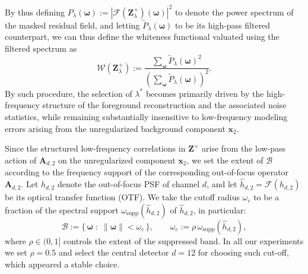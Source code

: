 \documentclass[letterpaper]{article}
\begin{document}
By thus defining
$
P_\lambda(\boldsymbol\omega)
:=
|\mathcal F(\mathbf Z_\lambda^+)(\boldsymbol\omega)|^2
$
to denote the power spectrum of the masked residual field, and letting
$
\widetilde P_\lambda(\boldsymbol\omega)
$
to be its high-pass filtered counterpart, we can thus define the whiteness functional valuated using the filtered spectrum as
\begin{equation}
    \mathcal W(\mathbf Z_\lambda^+)
    :=
    \frac{
    \displaystyle
    \sum_{\boldsymbol\omega}
    \widetilde P_\lambda(\boldsymbol\omega)^2
    }{
    \left(
    \displaystyle
    \sum_{\boldsymbol\omega}
    \widetilde P_\lambda(\boldsymbol\omega)
    \right)^2
    }.
\end{equation}
By such procedure, the selection of $\lambda^*$ becomes primarily driven by the high-frequency structure of the foreground reconstruction and the associated noise statistics, while remaining substantially insensitive to low-frequency modeling errors arising from the unregularized background component $\mathbf x_2$.


Since the structured low-frequency correlations in $\mathbf Z^+$ arise from the low-pass action of $\mathbf A_{d,2}$ on the unregularized component $\mathbf x_2$, we set the extent of $\mathcal B$ according to the frequency support of the corresponding out-of-focus operator $\mathbf{A}_{d,2}$. Let $h_{d,2}$ denote the out-of-focus PSF of channel $d$, and let $\widehat h_{d,2} = \mathcal F(h_{d,2})$ be its optical transfer function (OTF). We take the cutoff radius $\omega_c$ to be a fraction of the spectral support $\omega_{\mathrm{supp}}(\widehat h_{d,2})$ of $\widehat h_{d,2}$, in particular:
\begin{equation}
    \mathcal B
    :=
    \{\,\boldsymbol\omega \;:\; \|\boldsymbol\omega\| < \omega_c\,\},
    \qquad
    \omega_c := \rho\,\omega_{\mathrm{supp}}(\widehat h_{d,2}),
\end{equation}
where %
$\rho \in (0,1]$ controls the extent of the suppressed band. In all our experiments we set $\rho = 0.5$ and select the central detector $d = 12$ for choosing such cut-off, which appeared a stable choice.
\end{document}
